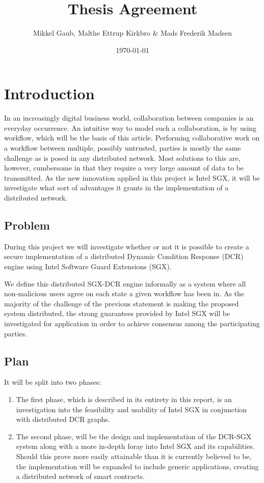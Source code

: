 \documentclass[12pt]{article}
\author{Mikkel Gaub, Malthe Ettrup Kirkbro \& Mads Frederik Madsen}
\title{Thesis Agreement}
\date{\today}
\begin{document}
\maketitle
\thispagestyle{empty}

\pagebreak

\tableofcontents

\pagebreak

	\section{Introduction}

	In an increasingly digital business world, collaboration between companies is an everyday occurrence.
	An intuitive way to model such a collaboration, is by using workflow, which will be the basis of this article.
	Performing collaborative work on a workflow between multiple, possibly untrusted, parties is mostly the same challenge as is posed in any distributed network. 
	Most solutions to this are, however, cumbersome in that they require a very large amount of data to be transmitted.
	As the new innovation applied in this project is Intel SGX, it will be investigate what sort of advantages it grants in the implementation of a distributed network.

		\subsection{Problem}
		\label{subsec:problem}

		During this project we will investigate whether or not it is possible to create a secure implementation of a distributed Dynamic Condition Response\cite{dcr-paper} (DCR) engine using Intel Software Guard Extensions\cite{intel-sgx-explained} (SGX).

		We define this distributed SGX-DCR engine informally as a system where all non-malicious users agree on each state a given workflow has been in.
		As the majority of the challenge of the previous statement is making the proposed system distributed, the strong guarantees provided by Intel SGX will be investigated for application in order to achieve consensus among the participating parties.

		\subsection{Plan}

		It will be split into two phases:
		\begin{enumerate}
			\item The first phase, which is described in its entirety in this report, is an investigation into the feasibility and usability of Intel SGX in conjunction with distributed DCR graphs.
			\item The second phase, will be the design and implementation of the DCR-SGX system along with a more in-depth foray into Intel SGX and its capabilities. Should this prove more easily attainable than it is currently believed to be, the implementation will be expanded to include generic applications, creating a distributed network of smart contracts\cite{smart-contracts}.
		\end{enumerate}
\end{document}
